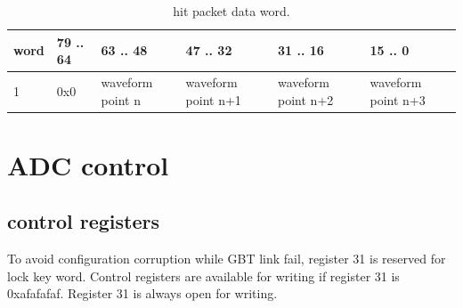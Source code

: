 \documentclass{article}
\begin{document}
\begin{table}[H]
\centering
\begin{tabular}{| l | l | l | l | l | l |}
\hline
word & 79 .. 64 & 63 .. 48 & 47 .. 32 & 31 .. 16 & 15 .. 0 \\ \hline
1 & 0x0 & waveform point n & waveform point n+1 & waveform point n+2 & waveform point n+3 \\ \hline
\end{tabular}
\caption{hit packet data word.\label{tab3}}
\end{table}


\section{ADC control}
\subsection{control registers}

To avoid configuration corruption while GBT link fail, register 31 is reserved for lock key word. Control registers are available for writing if register 31 is 0xafafafaf. Register 31 is always open for writing.
\end{document}
